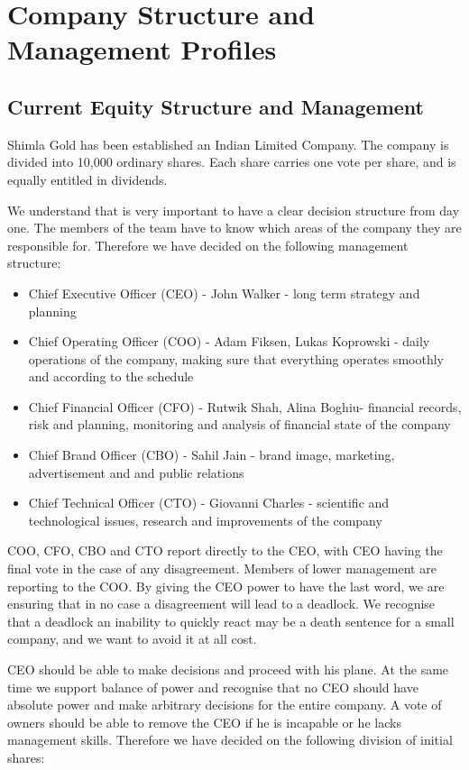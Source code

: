\documentclass[11pt]{article}
\begin{document}
\section{Company Structure and Management Profiles}

  \subsection{Current Equity Structure and Management}
Shimla Gold has been established an Indian Limited Company. The company is
divided into 10,000 ordinary shares. Each share carries one vote per share,
and is equally entitled in dividends.

We understand that is very important to have a clear decision structure from
day one. The members of the team have to know which areas of the company they
are responsible for. Therefore we have decided on the following management
structure:

  \begin{itemize}
  \item Chief Executive Officer (CEO) - John Walker -
long term strategy and planning
  \item Chief Operating Officer (COO) - Adam Fiksen, Lukas Koprowski -
daily operations of the company, making sure that everything operates smoothly
and according to the schedule
  \item Chief Financial Officer (CFO) - Rutwik Shah, Alina Boghiu-
financial records, risk and planning, monitoring and analysis of financial
state of the company
  \item Chief Brand Officer (CBO) - Sahil Jain -
 brand image, marketing, advertisement and and public relations
  \item Chief Technical Officer (CTO) - Giovanni Charles -
scientific and technological issues, research and improvements of the company
  \end{itemize}

COO, CFO, CBO and CTO report directly to the CEO, with CEO having the final vote
in the case of any disagreement. Members of lower management are reporting to
the COO. By giving the CEO power to have the last word, we are ensuring that in
no case a disagreement will lead to a deadlock. We recognise that a deadlock an
inability to quickly react may be a death sentence for a small company, and we
want to avoid it at all cost.

CEO should be able to make decisions and proceed with his plane. At the same
time we support balance of power and recognise that no CEO should have absolute
power and make arbitrary decisions for the entire company. A vote of owners
should be able to remove the CEO if he is incapable or he lacks management
skills. Therefore we have decided on the following division of initial shares:
\end{document}
